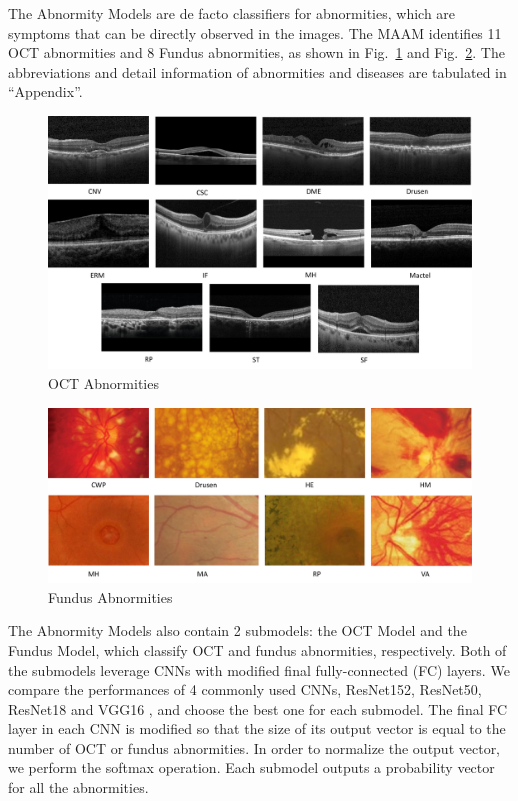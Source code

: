 \documentclass{article}
\begin{document}
	The Abnormity Models are de facto classifiers for abnormities, which are symptoms that can be directly observed in the images. The MAAM identifies 11 OCT abnormities and 8 Fundus abnormities, as shown in Fig.~\ref{fig:OCT_abnormities} and Fig.~\ref{fig:fundus_abnormities}. The abbreviations and detail information of abnormities and diseases are tabulated in ``Appendix''.
	
	\begin{figure}[htbp]
		\centering
		\includegraphics[width=\linewidth]{Figs/OCT_Abnormities.pdf}
		\caption{OCT Abnormities}
		\vspace{0.3cm}
		\label{fig:OCT_abnormities}
	\end{figure}
	
	\begin{figure}[htbp]
		\centering
		\includegraphics[width=\linewidth]{Figs/fundus_Abnormities.pdf}
		\caption{Fundus Abnormities}
		\vspace{0.3cm}
		\label{fig:fundus_abnormities}
	\end{figure}
	
	The Abnormity Models also contain 2 submodels: the OCT Model and the Fundus Model, which classify OCT and fundus abnormities, respectively. Both of the submodels leverage CNNs with modified final fully-connected (FC) layers. We compare the performances of 4 commonly used CNNs, ResNet152, ResNet50, ResNet18 \autocite{He_Zhang_Ren_Sun_2016} and VGG16 \autocite{Simonyan_Zisserman_2015}, and choose the best one for each submodel. The final FC layer in each CNN is modified so that the size of its output vector is equal to the number of OCT or fundus abnormities. In order to normalize the output vector, we perform the softmax operation. Each submodel outputs a probability vector for all the abnormities.
	
\end{document}
